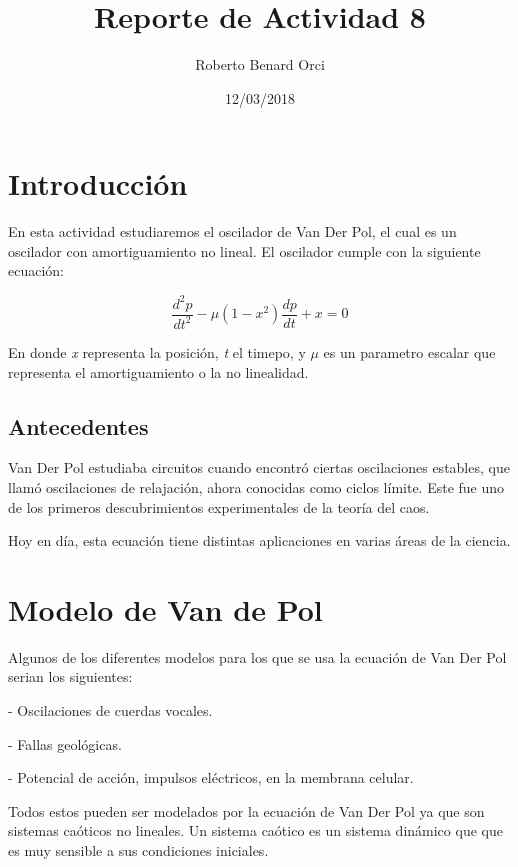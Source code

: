 \documentclass{article}
\title{Reporte de Actividad 8}
\author{Roberto Benard Orci}
\date{12/03/2018}
\begin{document}
\maketitle

\section{Introducción}

En esta actividad estudiaremos el oscilador de Van Der Pol, el cual es un oscilador con amortiguamiento no lineal. El oscilador cumple con la siguiente ecuación:

 \begin{equation}
 \frac{d^2p}{dt^2} -\mu (1-x^2)\frac{dp}{dt} + x = 0
 \end{equation}
 
En donde \textit{x} representa la posición, \textit{t} el timepo, y $\mu$ es un parametro escalar que representa el amortiguamiento o la no linealidad. 

\subsection{Antecedentes}

Van Der Pol estudiaba circuitos cuando encontró ciertas oscilaciones estables, que llamó oscilaciones de relajación, ahora conocidas como ciclos límite. Este fue uno de los primeros descubrimientos experimentales de la teoría del caos.

Hoy en día, esta ecuación tiene distintas aplicaciones en varias áreas de la ciencia.


\section{Modelo de Van de Pol}

Algunos de los diferentes modelos para los que se usa la ecuación de Van Der Pol serian los siguientes: 

\vspace{0.3cm}

\noindent - Oscilaciones de cuerdas vocales.

\noindent - Fallas geológicas.

\noindent - Potencial de acción, impulsos eléctricos, en la membrana celular.

\vspace{0.3cm}

Todos estos pueden ser modelados por la ecuación de Van Der Pol ya que son sistemas caóticos no lineales. Un sistema caótico es un sistema dinámico que que es muy sensible a sus condiciones iniciales. 
\end{document}
